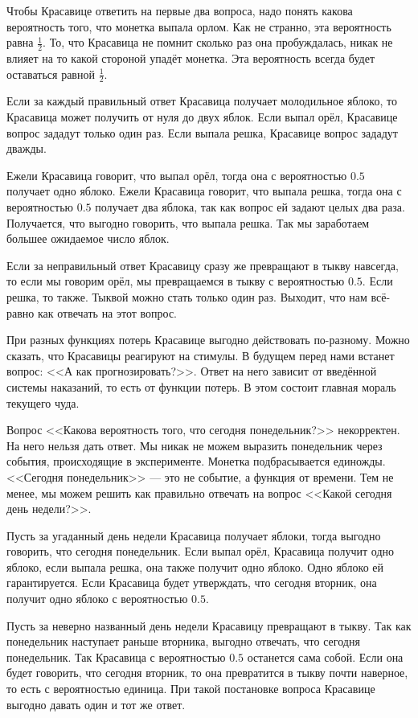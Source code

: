 \documentclass[12pt, a4paper, oneside]{extreport}
\theoremstyle{plain}              %
\theoremstyle{definition}         %
\begin{document}
Чтобы Красавице ответить на первые два вопроса, надо понять какова вероятность того, что монетка выпала орлом. Как не странно, эта вероятность равна $\frac{1}{2}$. То, что Красавица не помнит сколько раз она пробуждалась, никак не влияет на то какой стороной упадёт монетка. Эта вероятность всегда будет оставаться равной $\frac{1}{2}$.

Если за каждый правильный ответ Красавица получает молодильное яблоко, то Красавица может получить от нуля до двух яблок. Если выпал орёл, Красавице вопрос зададут только один раз. Если выпала решка, Красавице вопрос зададут дважды.

Ежели Красавица говорит, что выпал орёл, тогда она с вероятностью $0.5$ получает одно яблоко. Ежели Красавица говорит, что выпала решка, тогда она с вероятностью $0.5$ получает два яблока, так как вопрос ей задают целых два раза. Получается, что выгодно говорить, что выпала решка. Так мы заработаем большее ожидаемое число яблок.

Если за неправильный ответ Красавицу сразу же превращают в тыкву навсегда, то если мы говорим орёл, мы превращаемся в тыкву с вероятностью $0.5$. Если решка, то также. Тыквой можно стать только один раз. Выходит, что нам всё-равно как отвечать на этот вопрос.

При разных функциях потерь Красавице выгодно действовать по-разному. Можно сказать, что Красавицы реагируют на стимулы. В будущем перед нами встанет вопрос: <<А как прогнозировать?>>. Ответ на него зависит от введённой системы наказаний, то есть от функции потерь. В этом состоит главная мораль текущего чуда. 

Вопрос <<Какова вероятность того, что сегодня понедельник?>> некорректен. На него нельзя дать ответ. Мы никак не можем выразить понедельник через события, происходящие в эксперименте. Монетка подбрасывается единожды. <<Сегодня понедельник>> --- это не событие, а функция от времени. Тем не менее, мы можем решить как правильно отвечать на вопрос <<Какой сегодня день недели?>>.

Пусть за угаданный день недели Красавица получает яблоки, тогда выгодно говорить, что сегодня понедельник. Если выпал орёл, Красавица получит одно яблоко, если выпала решка, она также получит одно яблоко. Одно яблоко ей гарантируется. Если Красавица будет утверждать, что сегодня вторник, она получит одно яблоко с вероятностью $0.5$.

Пусть за неверно названный день недели Красавицу превращают в тыкву. Так как понедельник наступает раньше вторника, выгодно отвечать, что сегодня понедельник. Так Красавица с вероятностью $0.5$ останется сама собой. Если она будет говорить, что сегодня вторник, то она превратится в тыкву почти наверное, то есть с вероятностью единица. При такой постановке вопроса Красавице выгодно давать один и тот же ответ.
\end{document}
